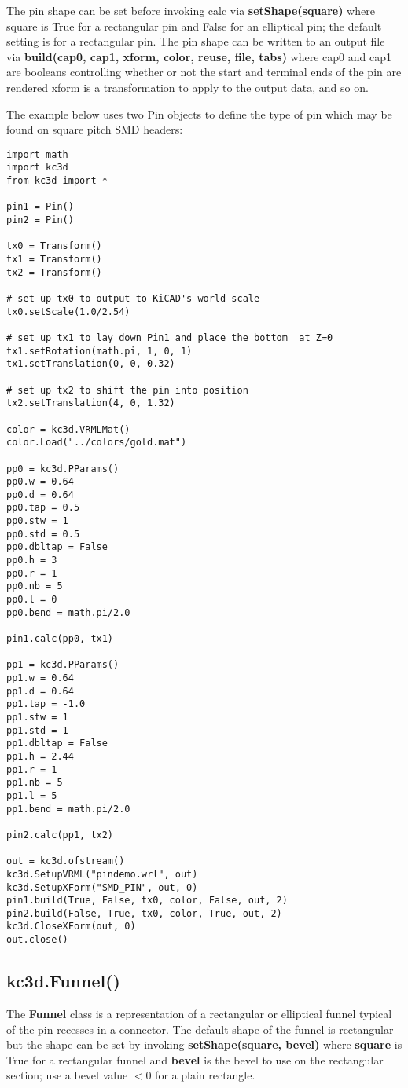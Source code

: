 \documentclass[a4paper, dvipdfm]{article}
\begin{document}
The pin shape can be set before invoking calc via \textbf{setShape(square)} where square
is True for a rectangular pin and False for an elliptical pin; the default setting is for a
rectangular pin. The pin shape can be written to an output file via
\textbf{build(cap0, cap1, xform, color, reuse, file, tabs)} where cap0 and cap1
are booleans controlling whether or not the start and terminal ends of the pin are rendered
xform is a transformation to apply to the output data, and so on.

The example below uses two Pin objects to define the type of pin which may be found on
square pitch SMD headers:

\begin{verbatim}
import math
import kc3d
from kc3d import *

pin1 = Pin()
pin2 = Pin()

tx0 = Transform()
tx1 = Transform()
tx2 = Transform()

# set up tx0 to output to KiCAD's world scale
tx0.setScale(1.0/2.54)

# set up tx1 to lay down Pin1 and place the bottom  at Z=0
tx1.setRotation(math.pi, 1, 0, 1)
tx1.setTranslation(0, 0, 0.32)

# set up tx2 to shift the pin into position
tx2.setTranslation(4, 0, 1.32)

color = kc3d.VRMLMat()
color.Load("../colors/gold.mat")

pp0 = kc3d.PParams()
pp0.w = 0.64
pp0.d = 0.64
pp0.tap = 0.5
pp0.stw = 1
pp0.std = 0.5
pp0.dbltap = False
pp0.h = 3
pp0.r = 1
pp0.nb = 5
pp0.l = 0
pp0.bend = math.pi/2.0

pin1.calc(pp0, tx1)

pp1 = kc3d.PParams()
pp1.w = 0.64
pp1.d = 0.64
pp1.tap = -1.0
pp1.stw = 1
pp1.std = 1
pp1.dbltap = False
pp1.h = 2.44
pp1.r = 1
pp1.nb = 5
pp1.l = 5
pp1.bend = math.pi/2.0

pin2.calc(pp1, tx2)

out = kc3d.ofstream()
kc3d.SetupVRML("pindemo.wrl", out)
kc3d.SetupXForm("SMD_PIN", out, 0)
pin1.build(True, False, tx0, color, False, out, 2)
pin2.build(False, True, tx0, color, True, out, 2)
kc3d.CloseXForm(out, 0)
out.close()
\end{verbatim}

\subsection{kc3d.Funnel()}
The \textbf{Funnel} class is a representation of a rectangular or elliptical funnel typical
of the pin recesses in a connector. The default shape of the funnel is rectangular but the
shape can be set by invoking \textbf{setShape(square, bevel)} where \textbf{square} is True for
a rectangular funnel and \textbf{bevel} is the bevel to use on the rectangular section; use
a bevel value $<0$ for a plain rectangle.
\end{document}
